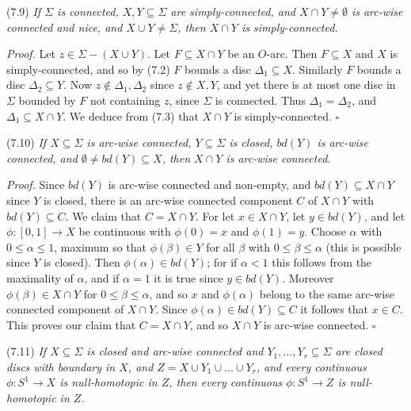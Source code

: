 \stmt
(7.9) \textit{If $\Sigma$ is connected, $X, Y \subseteq \Sigma$ are simply-connected, and $X \cap Y \ne \emptyset$ is arc-wise connected and nice, and $X \cup Y \ne \Sigma$, then $X \cap Y$ is simply-connected.}

\textit{Proof.} Let $z \in \Sigma - (X \cup Y)$. Let $F \subseteq X \cap Y$ be an $O$-arc. Then $F \subseteq X$ and $X$ is simply-connected, and so by (7.2) $F$ bounds a disc $\Delta_1 \subseteq X$. Similarly $F$ bounds a disc $\Delta_2 \subseteq Y$. Now $z \notin \Delta_1, \Delta_2$ since $z \notin X, Y$, and yet there is at most one disc in $\Sigma$ bounded by $F$ not containing $z$, since $\Sigma$ is connected. Thus $\Delta_1 = \Delta_2$, and $\Delta_1 \subseteq X \cap Y$. We deduce from (7.3) that $X \cap Y$ is simply-connected. $\square$

\stmt
(7.10) \textit{If $X \subseteq \Sigma$ is arc-wise connected, $Y \subseteq \Sigma$ is closed, $bd(Y)$ is arc-wise connected, and $\emptyset \ne bd(Y) \subseteq X$, then $X \cap Y$ is arc-wise connected.}

\textit{Proof.} Since $bd(Y)$ is arc-wise connected and non-empty, and $bd(Y) \subseteq X \cap Y$ since $Y$ is closed, there is an arc-wise connected component $C$ of $X \cap Y$ with $bd(Y) \subseteq C$. We claim that $C = X \cap Y$. For let $x \in X \cap Y$, let $y \in bd(Y)$, and let $\phi \colon [0, 1] \to X$ be continuous with $\phi(0) = x$ and $\phi(1) = y$. Choose $\alpha$ with $0 \le \alpha \le 1$, maximum so that $\phi(\beta) \in Y$ for all $\beta$ with $0 \le \beta \le \alpha$ (this is possible since $Y$ is closed). Then $\phi(\alpha) \in bd(Y)$; for if $\alpha < 1$ this follows from the maximality of $\alpha$, and if $\alpha = 1$ it is true since $y \in bd(Y)$. Moreover $\phi(\beta) \in X \cap Y$ for $0 \le \beta \le \alpha$, and so $x$ and $\phi(\alpha)$ belong to the same arc-wise connected component of $X \cap Y$. Since $\phi(\alpha) \in bd(Y) \subseteq C$ it follows that $x \in C$. This proves our claim that $C = X \cap Y$, and so $X \cap Y$ is arc-wise connected. $\square$

\stmt
(7.11) \textit{If $X \subseteq \Sigma$ is closed and arc-wise connected and $Y_1, \dots, Y_r \subseteq \Sigma$ are closed discs with boundary in $X$, and $Z = X \cup Y_1 \cup \dots \cup Y_r$, and every continuous $\phi \colon S^1 \to X$ is null-homotopic in $Z$, then every continuous $\phi \colon S^1 \to Z$ is null-homotopic in $Z$.}

